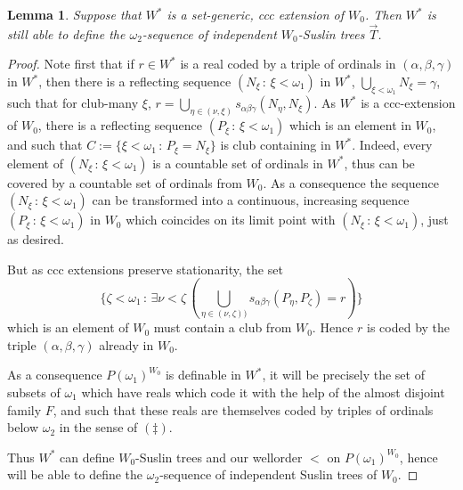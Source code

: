 \documentclass[a4paper,11pt]{article}
\newtheorem{lemma}[theorem]{Lemma}
\begin{document}
 \begin{lemma}\label{Definability of Suslin trees}
 Suppose that $W^{\ast}$ is a set-generic, ccc extension of $W_0$.
 Then $W^{\ast}$ is still able to define the $\omega_2$-sequence of independent
 $W_0$-Suslin trees $\vec{T}$.
\end{lemma}
\begin{proof}
 
 Note first that if $r \in W^{\ast}$ is a real coded by a triple of ordinals in $(\alpha, \beta, \gamma)$ in
 $W^{\ast}$, then there is a reflecting sequence $(N_{\xi} \, : \, \xi < \omega_1)$ in
 $W^{\ast}$, $\bigcup_{\xi < \omega_1} N_{\xi} = \gamma$, such that 
 for club-many $\xi$, $r = \bigcup_{\eta \in (\nu, \xi)} s_{\alpha \beta \gamma} (N_{\eta}, N_{\xi})$.
 As $W^{\ast}$ is a ccc-extension of $W_0$, there is a reflecting sequence $(P_{\xi} \, : \, \xi < \omega_1)$ which is 
 an element in $W_0$, and such that $C:=\{ \xi < \omega_1 \, : \, P_{\xi} = N_{\xi}\}$ is 
 club containing in $W^{\ast}$. Indeed, every element of $(N_{\xi} \, : \, \xi < \omega_1)$ is a countable set of ordinals in $W^{\ast}$, thus can be covered by a countable set of ordinals from $W_0$.  As a consequence the sequence $(N_{\xi} \, : \, \xi < \omega_1)$ can be transformed into a continuous, increasing sequence $(P_{\xi} \, : \, \xi < \omega_1)$ in $W_0$ which coincides on its limit point with $(N_{\xi} \, : \, \xi < \omega_1)$, just as desired.
 
 But as ccc extensions preserve stationarity, the set $$\{ \zeta < \omega_1 \, : \, \exists \nu < \zeta \, ( \bigcup_{\eta \in (\nu, \zeta))}
 s_{\alpha \beta \gamma} (P_{\eta}, P_{\zeta}) = r )\}$$ which is an element of $W_0$ must contain a club from 
 $W_0$. Hence $r$ is coded by the triple $(\alpha, \beta, \gamma)$ already in $W_0$.
 
 As a consequence $P(\omega_1)^{W_0}$ is definable in $W^{\ast}$, it will be precisely
 the set of subsets of $\omega_1$ which have reals which code it with the help of 
 the almost disjoint family $F$, and such that these reals are themselves
 coded by triples of ordinals below $\omega_2$ in the sense of $(\ddagger)$.
 
 Thus $W^{\ast}$ can define $W_0$-Suslin trees and our wellorder $<$ on $P(\omega_1)^{W_0}$, hence will be able to define 
 the $\omega_2$-sequence of independent Suslin trees of $W_0$.
 
\end{proof}
\end{document}
